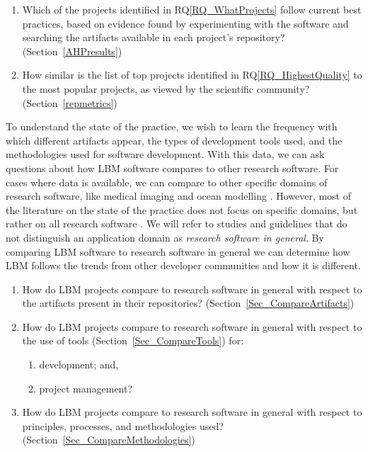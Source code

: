 \documentclass[final, 3p, times, authoryear]{elsarticle}
\newcounter{rqnum} %
\newcommand{\rqref}[1]{RQ\ref{#1}}
\begin{document}
\begin{enumerate}
	\item [RQ\refstepcounter{rqnum}\therqnum \label{RQ_HighestQuality}:] Which
	of the projects identified in \rqref{RQ_WhatProjects} follow current best
	practices, based on evidence found by experimenting with the software and
	searching the artifacts available in each project's repository?
	(Section~\ref{AHPresults})
	\item [RQ\refstepcounter{rqnum}\therqnum \label{RQ_CompareHQ2Popular}:] How
	similar is the list of top projects identified in \rqref{RQ_HighestQuality}
	to the most popular projects, as viewed by the scientific community?
	(Section~\ref{repmetrics})
\end{enumerate}

To understand the state of the practice, we wish to learn the frequency with
which different artifacts appear, the types of development tools used, and the
methodologies used for software development.  With this data, we can ask
questions about how LBM software compares to other research software.  For cases
where data is available, we can compare to other specific domains of research
software, like medical imaging \citep{Dong2021} and ocean modelling
\citep{JungEtAl2022}.  However, most of the literature on the state of the
practice does not focus on specific domains, but rather on all research software
\citep{SmithAndMichalski2022}. We will refer to studies and guidelines that do
not distinguish an application domain as \emph{research software in general}. By
comparing LBM software to research software in general we can determine how LBM
follows the trends from other developer communities and how it is different.

\begin{enumerate}
    \item [RQ\refstepcounter{rqnum}\therqnum \label{RQ_CompareArtifacts}:] How
	do LBM projects compare to research software in general with respect to the
	artifacts present in their repositories?
	(Section~\ref{Sec_CompareArtifacts})
	\item [RQ\refstepcounter{rqnum}\therqnum \label{RQ_CompareToolsProjMngmnt}:]
	How do LBM projects compare to research software in general with respect to
	the use of tools (Section~\ref{Sec_CompareTools}) for:
	\begin{enumerate} 
		\item [\rqref{RQ_CompareToolsProjMngmnt}.a] development; and,
		\item [\rqref{RQ_CompareToolsProjMngmnt}.b] project management?
	\end{enumerate}
	\item [RQ\refstepcounter{rqnum}\therqnum \label{RQ_CompareMethodologies}:]
	How do LBM projects compare to research software in general with respect to
	principles, processes, and methodologies used?
	(Section~\ref{Sec_CompareMethodologies})
\end{enumerate}	
\end{document}
